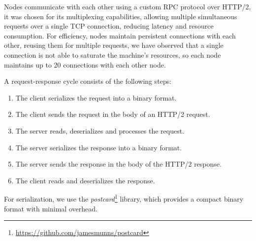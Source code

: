 Nodes communicate with each other using a custom RPC protocol over HTTP/2, it
was chosen for its multiplexing capabilities, allowing multiple simultaneous
requests over a single TCP connection, reducing latency and resource
consumption.
For efficiency, nodes maintain persistent connections with each other, reusing
them for multiple requests, we have observed that a single connection is not
able to saturate the machine's resources, so each node maintains up to 20
connections with each other node.

A request-response cycle consists of the following steps:
\begin{enumerate}
    \item The client serializes the request into a binary format.
    \item The client sends the request in the body of an HTTP/2 request.
    \item The server reads, deserializes and processes the request.
    \item The server serializes the response into a binary format.
    \item The server sends the response in the body of the HTTP/2 response.
    \item The client reads and deserializes the response.
\end{enumerate}

For serialization, we use the
\emph{postcard}\footnote{\url{https://github.com/jamesmunns/postcard}} library,
which provides a compact binary format with minimal overhead.
